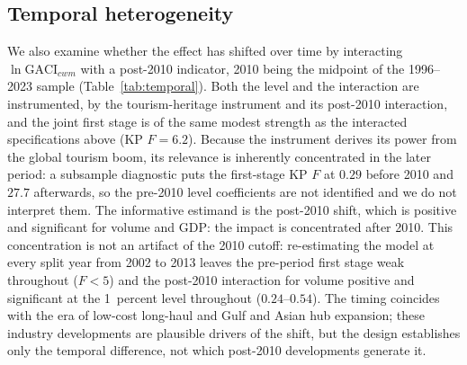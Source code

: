 \subsection{Temporal heterogeneity}
\label{sec:temporal}
We also examine whether the effect has shifted over time by interacting
$\ln\mathrm{GACI}_{cwm}$ with a post-2010 indicator, 2010 being the midpoint
of the 1996--2023 sample (Table~\ref{tab:temporal}). Both the level and the
interaction are instrumented, by the tourism-heritage instrument and its
post-2010 interaction, and the joint first stage is of the same modest
strength as the interacted specifications above (KP $F=6.2$). Because the
instrument derives its power from the global tourism boom, its relevance is
inherently concentrated in the later period: a subsample diagnostic puts the
first-stage KP $F$ at $0.29$ before 2010 and $27.7$ afterwards, so the
pre-2010 level coefficients are not identified and we do not interpret them.
The informative estimand is the post-2010 shift, which is positive and
significant for volume and GDP: the impact is concentrated after 2010. This
concentration is not an artifact of the 2010 cutoff: re-estimating the model
at every split year from 2002 to 2013 leaves the pre-period first stage weak
throughout ($F<5$) and the post-2010 interaction for volume positive and
significant at the 1~percent level throughout ($0.24$--$0.54$). The timing
coincides with the era of low-cost long-haul and Gulf and Asian hub
expansion; these industry developments are plausible drivers of the shift,
but the design establishes only the temporal difference, not which post-2010
developments generate it.

